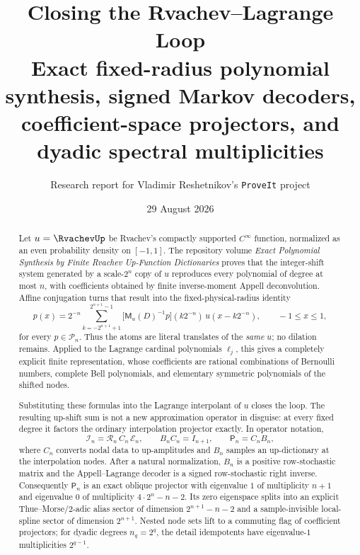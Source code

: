 \documentclass[11pt,oneside]{article}
\title{\bfseries Closing the Rvachev--Lagrange Loop\\[0.45em]
\large Exact fixed-radius polynomial synthesis, signed Markov decoders,\\
coefficient-space projectors, and dyadic spectral multiplicities}
\author{Research report for Vladimir Reshetnikov's \texttt{ProveIt} project}
\date{29 August 2026}
\numberwithin{equation}{section}
\theoremstyle{definition}
\theoremstyle{remark}
\newcommand{\PiN}{\mathcal P}
\newcommand{\MGF}{\mathsf M}
\newcommand{\Lag}{\mathcal I}
\newcommand{\Eval}{\mathcal E}
\newcommand{\Synth}{\mathcal R}
\newcommand{\Proj}{\mathsf P}
\begin{document}
\maketitle

\begin{abstract}
Let $u=\RvachevUp$ be Rvachev's compactly supported $C^\infty$ function,
normalized as an even probability density on $[-1,1]$.  The repository volume
\emph{Exact Polynomial Synthesis by Finite Rvachev Up-Function Dictionaries}
proves that the integer-shift system generated by a scale-$2^n$ copy of $u$
reproduces every polynomial of degree at most $n$, with coefficients obtained
by finite inverse-moment Appell deconvolution.  Affine conjugation turns that
result into the fixed-physical-radius identity
\[
 p(x)=2^{-n}\sum_{k=-2^{n+1}+1}^{2^{n+1}-1}
 \bigl[\MGF_u(D)^{-1}p\bigr](k2^{-n})\,u(x-k2^{-n}),
 \qquad -1\le x\le1,
\]
for every $p\in\PiN_n$.  Thus the atoms are literal translates of the
\emph{same} $u$; no dilation remains.  Applied to the Lagrange cardinal
polynomials $\ell_j$, this gives a completely explicit finite representation,
whose coefficients are rational combinations of Bernoulli numbers, complete
Bell polynomials, and elementary symmetric polynomials of the shifted nodes.

Substituting these formulas into the Lagrange interpolant of $u$ closes the
loop.  The resulting up-shift sum is not a new approximation operator in
disguise: at every fixed degree it factors the ordinary interpolation
projector exactly.  In operator notation,
\[
 \Lag_n=\Synth_n\,C_n\,\Eval_n,
 \qquad B_nC_n=I_{n+1},
 \qquad \Proj_n=C_nB_n,
\]
where $C_n$ converts nodal data to up-amplitudes and $B_n$ samples an
up-dictionary at the interpolation nodes.  After a natural normalization,
$B_n$ is a positive row-stochastic matrix and the Appell--Lagrange decoder is
a signed row-stochastic right inverse.  Consequently $\Proj_n$ is an exact
oblique projector with eigenvalue $1$ of multiplicity $n+1$ and eigenvalue
$0$ of multiplicity $4\cdot2^n-n-2$.  Its zero eigenspace splits into an
explicit Thue--Morse/$2$-adic alias sector of dimension $2^{n+1}-n-2$ and a
sample-invisible local-spline sector of dimension $2^{n+1}$.  Nested node
sets lift to a commuting flag of coefficient projectors; for dyadic degrees
$n_q=2^q$, the detail idempotents have eigenvalue-$1$ multiplicities
$2^{q-1}$.


\end{abstract}
\end{document}
